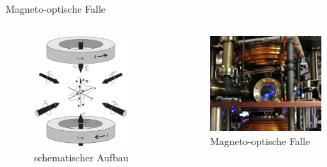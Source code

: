 \documentclass[12pt,xcolor=dvipsnames,professionalfonts]{beamer}
\begin{document}
\begin{frame}{Magneto-optische Falle}
\begin{columns}
	\begin{figure}
		\centering
		\includegraphics[width=0.9\textwidth]{./figures/mot_3d.png}
		\caption{schematischer Aufbau \cite{foot}}
	\end{figure}

	\begin{figure}
		\centering
		\includegraphics[width=0.9\textwidth]{./figures/mot_columbia.jpg}
		\caption{Magneto-optische Falle \cite{columbia}}
	\end{figure}
\end{columns}
\end{frame}
\end{document}
